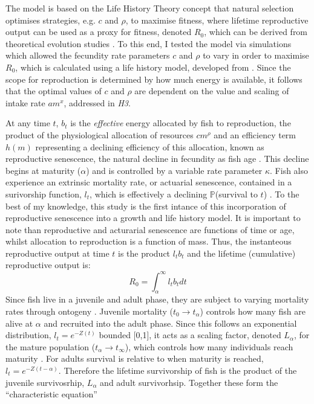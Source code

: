 \documentclass[a4paper]{article} %
\begin{document}
The model is based on the Life History Theory concept that natural selection optimises strategies, e.g. $c$ and $\rho$, to maximise fitness, where lifetime reproductive output can be used as a proxy for fitness, denoted $R_0$, which can be derived from theoretical evolution studies \autocite{Charnov2001, stearns1992evolution}. To this end, I tested the model via simulations which allowed the fecundity rate parameters $c$ and $\rho$ to vary in order to maximise $R_0$, which is calculated using a life history model, developed from \cite{Charnov2001}. Since the scope for reproduction is determined by how much energy is available, it follows that the optimal values of $c$ and $\rho$ are dependent on the value and scaling of intake rate $am^{x}$, addressed in \textit{H3}. 

At any time $t$, $b_{t}$ is the \textit{effective} energy allocated by fish to reproduction, the product of the physiological allocation of resources $cm^{\rho}$ and an efficiency term $h(m)$ representing a declining efficiency of this allocation, known as reproductive senescence, the natural decline in fecundity as fish age \autocite{Stearns2000, Benoit2018, Vrtilek2018}. This decline begins at maturity ($\alpha$) and is controlled by a variable rate parameter $\kappa$. Fish also experience an extrinsic mortality rate, or actuarial senescence, contained in a surivorship function, $l_t$, which is effectively a declining $\mathbb{P}$(survival to $t$) \autocite{Beverton1959, Peterson1984, Charnov1993,Walters1993, Charnov2001, Benoit2018, Laird2010, Reznick2002, Reznick2006}. To the best of my knowledge, this study is the first intance of this incorporation of reproductive senescence into a growth and life history model. It is important to note than reproductive and acturarial senescence are functions of time or age, whilst allocation to reproduction is a function of mass. Thus, the instanteous reproductive output at time $t$ is the product $l_{t}b_{t}$ and the lifetime (cumulative) reproductive output is:
\begin{equation}
    R_{0} = \int_{\alpha}^{\infty}l_{t}b_{t} dt
\end{equation}
Since fish live in a juvenile and adult phase, they are subject to varying mortality rates through ontogeny \autocite{Charnov2001}. Juvenile mortality ($t_0 \rightarrow t_{\alpha}$) controls how many fish are alive at $\alpha$ and recruited into the adult phase. Since this follows an exponential distribution, $l_t = e^{-Z(t)}$ bounded [0,1], it acts as a scaling factor, denoted $L_{\alpha}$, for the mature population ($t_{\alpha} \rightarrow t_{\infty}$), which controls how many individuals reach maturity \autocite{Charnov1990-agematurity}. For adults survival is relative to when maturity is reached, $l_{t} = e^{-Z(t-\alpha)}$. Therefore the lifetime survivorship of fish is the product of the juvenile survivosrhip, $L_{\alpha}$ and adult survivorhsip. Together these form the ``characteristic equation'' 
\end{document}

